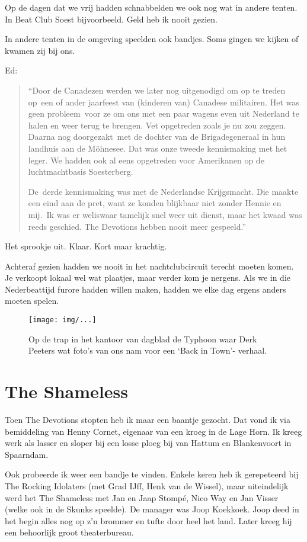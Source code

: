 \documentclass[10pt,twoside,openright]{memoir}
\begin{document}
Op de dagen dat we vrij hadden schnabbelden we ook nog wat in andere tenten. In Beat Club Soest bijvoorbeeld. Geld heb ik nooit gezien. 

In andere tenten in de omgeving speelden ook bandjes. Soms gingen we kijken of kwamen zij bij ons. 	

Ed:

\begin{quote}
``Door de Canadezen werden we later nog uitgenodigd om op te treden op een of ander jaarfeest van (kinderen van) Canadese militairen. Het was geen probleem voor ze om ons met een paar wagens even uit Nederland te halen en weer terug te brengen. Vet opgetreden zoals je nu zou zeggen. Daarna nog doorgezakt met de dochter van de Brigadegeneraal in hun landhuis aan de Möhnesee. Dat was onze tweede kennismaking met het leger. We hadden ook al eens opgetreden voor Amerikanen op de luchtmachtbasis Soesterberg. 

De derde kennismaking was met de Nederlandse Krijgsmacht. Die maakte een eind aan de pret, want ze konden blijkbaar niet zonder Hennie en mij. Ik was er weliswaar tamelijk snel weer uit dienst, maar het kwaad was reeds geschied. The Devotions hebben nooit meer gespeeld.'' 
\end{quote}

Het sprookje uit. Klaar. Kort maar krachtig.

Achteraf gezien hadden we nooit in het nachtclubcircuit terecht moeten komen. Je verkoopt lokaal wel wat plaatjes, maar verder kom je nergens. Als we in die Nederbeattijd furore hadden willen maken, hadden we elke dag ergens anders moeten spelen.

\begin{figure}[t]
\texttt{[image: img/...]}
\caption{Op de trap in het kantoor van dagblad de Typhoon waar Derk Peeters wat foto’s van ons nam voor een `Back in Town'- verhaal.}
\end{figure}


\chapter{The Shameless} %
\label{cha:shameless}

Toen The Devotions stopten heb ik maar een baantje gezocht. Dat vond ik via bemiddeling van Henny Cornet, eigenaar van een kroeg in de Lage Horn. Ik kreeg werk als lasser en sloper bij een losse ploeg bij van Hattum en Blankenvoort in Spaarndam.

Ook probeerde ik weer een bandje te vinden. Enkele keren heb ik gerepeteerd bij The Rocking Idolaters (met Grad IJff, Henk van de Wissel), maar uiteindelijk werd het The Shameless met Jan en Jaap Stompé, Nico Way en Jan Visser (welke ook in de Skunks speelde). De manager was Joop Koekkoek. Joop deed in het begin alles nog op z’n brommer en tufte door heel het land. Later kreeg hij een behoorlijk groot theaterbureau. 
\end{document}
